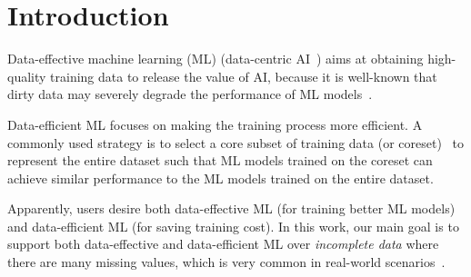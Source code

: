 \section{Introduction} 
\label{sec:intro}





Data-effective machine learning (ML) (\aka data-centric AI~\cite{mlops}) aims at obtaining high-quality training data to release the value of AI, because it is well-known that dirty data may severely degrade the performance of ML models~\cite{cleaning4ml, chai2022data}.

Data-efficient ML focuses on making the training process more efficient. A commonly used strategy is to select a core subset of training data (or coreset)~\cite{DBLP:journals/corr/abs-2011-09384,munteanu2018coresets} to represent the entire dataset such that ML models trained on the coreset can achieve similar performance to the ML models trained on the entire dataset.

Apparently, users desire both data-effective ML (for training better ML models) and data-efficient ML (for saving training cost). In this work, our main goal is to support both data-effective and data-efficient ML over \textit{incomplete data} where there are many missing values, which is very common in real-world scenarios~\cite{chai2022data, DBLP:conf/icml/YoonJS18, miao2022experimental}.


